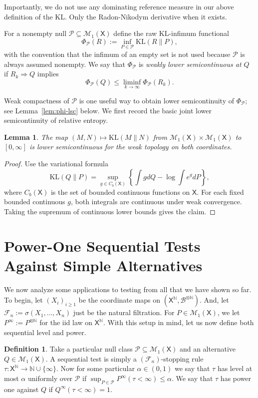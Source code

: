 \documentclass[11pt]{article}
\newcommand{\KL}{\mathrm{KL}}
\newcommand{\Pcal}{\mathcal{P}}
\newcommand{\X}{\mathsf{X}}
\newcommand{\B}{\mathcal{B}}
\newtheorem{lemma}[theorem]{Lemma}
\theoremstyle{definition}
\newtheorem{definition}[theorem]{Definition}
\theoremstyle{definition}
\begin{document}
\noindent Importantly, we do not use any dominating reference measure in our above definition of the KL. Only the Radon-Nikodym derivative when it exists.


For a nonempty null $\Pcal\subseteq\mathcal M_1(\X)$ define the raw KL-infimum functional
\[
  \Phi_\Pcal(R):=\inf_{P\in\Pcal}\KL(R\|P),
\]
with the convention that the infimum of an empty set is not used because $\Pcal$ is always assumed nonempty.  We say that $\Phi_\Pcal$ is \emph{weakly lower semicontinuous at $Q$} if $R_k\Rightarrow Q$ implies
\[
  \Phi_\Pcal(Q)\le \liminf_{k\to\infty}\Phi_\Pcal(R_k).
\]


Weak compactness of $\Pcal$ is one useful way to obtain lower semicontinuity of $\Phi_\Pcal$; see Lemma~\ref{lem:phi-lsc} below.  We first record the basic joint lower semicontinuity of relative entropy.

\begin{lemma}\label{lem:kl-lsc}
The map $(M, N)\mapsto\KL(M\|N)$ from $\mathcal{M}_1(\X)\times\mathcal{M}_1(\X)$ to $[0,\infty]$ is lower semicontinuous for the weak topology on both coordinates.  
\end{lemma}

\begin{proof}
Use the variational formula
\[
  \KL(Q\|P)=\sup_{g\in C_b(\X)}\left\{\int gd Q-\log\int e^gd P\right\},
\]
where $C_b(\X)$ is the set of bounded continuous functions on $\X$.
For each fixed bounded continuous \(g\), both integrals are continuous under weak convergence.  Taking the supremum of continuous lower bounds gives the claim.
\end{proof}




\section{Power-One Sequential Tests Against Simple Alternatives}\label{sec:simple}

We now analyze some applications to testing from all that we have shown so far. To begin, let $(X_i)_{i\ge 1}$ be the coordinate maps on $(\X^{\mathbb N},\B^{\otimes \mathbb N})$. And, let $\mathcal F_n:=\sigma(X_1, \dots, X_n)$ just be the natural filtration. For $P\in\mathcal M_1(\X)$, we let $P^\infty:=P^{\otimes \mathbb N}$ for the iid law on $\X^{\mathbb N}$. With this setup in mind, let us now define both sequential level and power.

\begin{definition}\label{def:seq-test}
Take a particular null class $\Pcal\subseteq\mathcal M_1(\X)$ and an alternative $Q\in\mathcal M_1(\X)$. A sequential test is simply a $(\mathcal F_n)$-stopping rule $\tau:\X^{\mathbb N}\to\mathbb N\cup\{\infty\}$. Now for some particular $\alpha\in(0,1)$ we say that $\tau$ has level at most $\alpha$ uniformly over $\Pcal$ if $\sup_{P\in\Pcal} P^\infty(\tau<\infty)\le \alpha$. We say that $\tau$ has power one against $Q$ if $Q^\infty(\tau<\infty)=1$.   
\end{definition}
\end{document}
